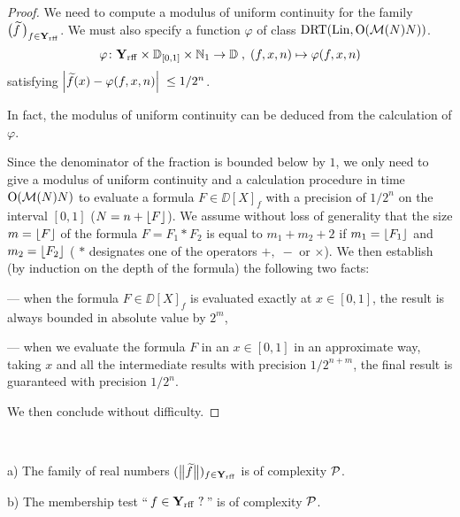 \begin{proof} We need to compute a modulus of uniform continuity for the family $\big(\widetilde{f}\,\big)_{f \in {{\bf Y}_{\rm rff}} }$. We must also specify a function $\varphi$  of class ${\rm DRT}({\rm Lin},{\rm O}({{\cal M}}(N) N))$.
\[ 
\varphi\colon {{\bf Y}_{\rm rff}} \times \mathbb {D}_{[0,1]} \times \mathbb {N}_1 \to \mathbb {D} \; ,\;
(f,x,n) \mapsto \varphi(f,x,n)
\]
satisfying $\left|{\widetilde{f}(x) - \varphi(f,x,n)}\right|\; \leq 1/2^n$.

\noindent In fact, the modulus of uniform continuity can be deduced from the calculation of $\varphi $.

\noindent 
Since the denominator of the fraction is bounded below by $1$, we only need to give a modulus of uniform continuity and a calculation procedure in time ${\rm O}({{\cal M}}(N) N)$ to evaluate a formula $F \in \DD[X]_f$ with a precision of $1/2^n$ on the interval $[0,1]$ ($N = n+ \lfloor F \rfloor$). We assume without loss of generality that the size $m = \lfloor F \rfloor$ of the formula $F = F_1 * F_2$ is equal to $ m_1+m_2+2$ if $m_1 = \lfloor F_1 \rfloor$ and $m_2 = \lfloor F_2 \rfloor$ ( $*$ designates one of the operators $+,\;-$ or $\times$). 
We then establish (by induction on the depth of the formula) the following two facts:

\noindent 
--- when the formula $F \in \DD[X]_f$ is evaluated exactly at $x \in [0,1]$, the result is always bounded in absolute value by $2^m$, 

\noindent 
--- when we evaluate the formula $F$ in an $x \in [0,1]$ in an approximate way, taking $x$ and all the intermediate results with precision  $1/2^{n+m}$, the final result is guaranteed with precision $1/2^n$. 

\noindent 
We then conclude without difficulty.
\end{proof}

\begin{proposition} \label{327}~

\noindent 
a) The family of real numbers $(\big\lVert  \widetilde{f} \big\rVert)_{f \in {{\bf Y}_{\rm rff}} }$ is of complexity ${\cal P}$.

\noindent 
b) The membership test ``$\,f \in{{\bf Y}_{\rm rff}}\; ?\,$'' is of complexity ${\cal P}$.
\end{proposition}

